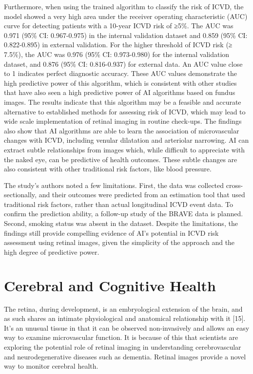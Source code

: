 \documentclass[
  Letterpaper,
]{scrbook}
\begin{document}
Furthermore, when using the trained algorithm to classify the risk of
ICVD, the model showed a very high area under the receiver operating
characteristic (AUC) curve for detecting patients with a 10-year ICVD
risk of ≥5\%. The AUC was 0.971 (95\% CI: 0.967-0.975) in the internal
validation dataset and 0.859 (95\% CI: 0.822-0.895) in external
validation. For the higher threshold of ICVD risk (≥ 7.5\%), the AUC was
0.976 (95\% CI: 0.973-0.980) for the internal validation dataset, and
0.876 (95\% CI: 0.816-0.937) for external data. An AUC value close to 1
indicates perfect diagnostic accuracy. These AUC values demonstrate the
high predictive power of this algorithm, which is consistent with other
studies that have also seen a high predictive power of AI algorithms
based on fundus images. The results indicate that this algorithm may be
a feasible and accurate alternative to established methods for assessing
risk of ICVD, which may lead to wide scale implementation of retinal
imaging in routine check-ups. The findings also show that AI algorithms
are able to learn the association of microvascular changes with ICVD,
including venular dilatation and arteriolar narrowing. AI can extract
subtle relationships from images which, while difficult to appreciate
with the naked eye, can be predictive of health outcomes. These subtle
changes are also consistent with other traditional risk factors, like
blood pressure.

The study's authors noted a few limitations. First, the data was
collected cross-sectionally, and their outcomes were predicted from an
estimation tool that used traditional risk factors, rather than actual
longitudinal ICVD event data. To confirm the prediction ability, a
follow-up study of the BRAVE data is planned. Second, smoking status was
absent in the dataset. Despite the limitations, the findings still
provide compelling evidence of AI's potential in ICVD risk assessment
using retinal images, given the simplicity of the approach and the high
degree of predictive power.

\section{Cerebral and Cognitive
Health}\label{cerebral-and-cognitive-health}

The retina, during development, is an embryological extension of the
brain, and as such shares an intimate physiological and anatomical
relationship with it {[}15{]}. It's an unusual tissue in that it can be
observed non-invasively and allows an easy way to examine microvascular
function. It is because of this that scientists are exploring the
potential role of retinal imaging in understanding cerebrovascular and
neurodegenerative diseases such as dementia. Retinal images provide a
novel way to monitor cerebral health.
\end{document}
